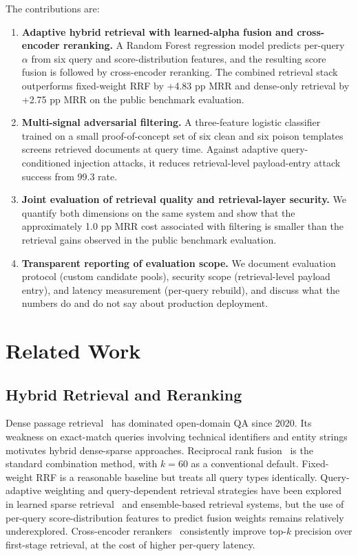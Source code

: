 \documentclass[sigconf]{acmart}
\begin{document}
The contributions are:
\begin{enumerate}
\item \textbf{Adaptive hybrid retrieval with learned-alpha fusion and
cross-encoder reranking.} A Random Forest regression model predicts per-query
$\alpha$ from six query and score-distribution features, and the resulting
score fusion is followed by cross-encoder reranking. The combined retrieval
stack outperforms fixed-weight RRF by +4.83 pp MRR and dense-only retrieval by
+2.75 pp MRR on the public benchmark evaluation.

\item \textbf{Multi-signal adversarial filtering.} A three-feature logistic
classifier trained on a small proof-of-concept set of six clean and six poison templates screens retrieved documents at query time. Against adaptive query-conditioned injection attacks, it reduces retrieval-level payload-entry attack success from 99.3%
rate.

\item \textbf{Joint evaluation of retrieval quality and retrieval-layer
security.} We quantify both dimensions on the same system and show that the
approximately 1.0 pp MRR cost associated with filtering is smaller than the
retrieval gains observed in the public benchmark evaluation.

\item \textbf{Transparent reporting of evaluation scope.} We document
evaluation protocol (custom candidate pools), security scope (retrieval-level
payload entry), and latency measurement (per-query rebuild), and discuss what
the numbers do and do not say about production deployment.
\end{enumerate}

\section{Related Work}

\subsection{Hybrid Retrieval and Reranking}

Dense passage retrieval~\cite{karpukhin2020dpr} has dominated open-domain QA
since 2020. Its weakness on exact-match queries involving technical identifiers
and entity strings~\cite{zhao2022dense} motivates hybrid dense-sparse
approaches. Reciprocal rank fusion~\cite{cormack2009rrf} is the standard
combination method, with $k{=}60$ as a conventional default. Fixed-weight RRF
is a reasonable baseline but treats all query types identically. Query-adaptive weighting and query-dependent retrieval strategies have been
explored in learned sparse retrieval~\cite{formal2021splade} and ensemble-based retrieval systems, but the use of per-query score-distribution features to predict fusion weights remains relatively underexplored. Cross-encoder rerankers~\cite{nogueira2020passage,devlin2019bert} consistently improve top-$k$ precision over first-stage retrieval, at the cost of higher per-query latency.
\end{document}
